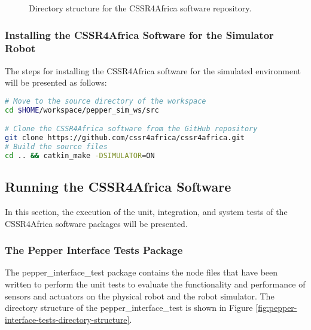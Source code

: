 \documentclass{CSSRforAfrica}
\begin{document}
{\begin{figure}[ht]
{\small 
{}
}

\caption{Directory structure for the CSSR4Africa software repository.}
\label{fig:pepper-robot-workspace-directory}
\end{figure}

\subsubsection{Installing the CSSR4Africa Software for the Simulator Robot}
\label{sim-soft}
The steps for installing the CSSR4Africa software for the simulated environment will be presented as follows:

\begin{lstlisting}[style=withoutNumbering, language=bash]
# Move to the source directory of the workspace
cd $HOME/workspace/pepper_sim_ws/src

# Clone the CSSR4Africa software from the GitHub repository
git clone https://github.com/cssr4africa/cssr4africa.git
# Build the source files
cd .. && catkin_make -DSIMULATOR=ON
\end{lstlisting}

\subsection{Running the CSSR4Africa Software}
In this section, the execution of the unit, integration, and system tests of the CSSR4Africa software packages will be presented.

\subsubsection{The Pepper Interface Tests Package}
The pepper\_interface\_test package contains the node files that have been written to perform the unit tests to evaluate the functionality and performance of sensors and actuators on the physical robot and the robot simulator. The directory structure of the pepper\_interface\_test is shown in Figure \ref{fig:pepper-interface-tests-directory-structure}.

}
\end{document}
